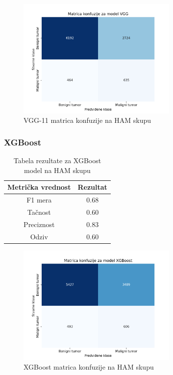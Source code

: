 \documentclass{article}
\begin{document}
\begin{figure}[H]
    \centering
    \includegraphics[width=0.7\textwidth]{rezultati/VGG_HAM_matrica_konfuzije.png} 
    \caption{VGG-11 matrica konfuzije na HAM skupu} 
    \label{VGG HAM matrica konfuzije}
\end{figure}

\subsubsection{XGBoost}
\begin{table}[H]
    \centering
    \begin{tabular}{|c|c|}
        \hline
        \textbf{Metrička vrednost} & \textbf{Rezultat} \\ \hline
        F1 mera & 0.68 \\ \hline
        Tačnost & 0.60 \\ \hline
        Preciznost & 0.83 \\ \hline
        Odziv & 0.60 \\ \hline
    \end{tabular}
    \caption{Tabela rezultate za XGBoost model na HAM skupu}
    \label{tab:XGbBoost rezultati na HAM skupu}
\end{table}

\begin{figure}[H]
    \centering
    \includegraphics[width=0.7\textwidth]{rezultati/XGBoost_HAM_matrica_konfuzije.png} 
    \caption{XGBoost matrica konfuzije na HAM skupu} 
    \label{XGBoost HAM matrica konfuzije}
\end{figure}
\end{document}
